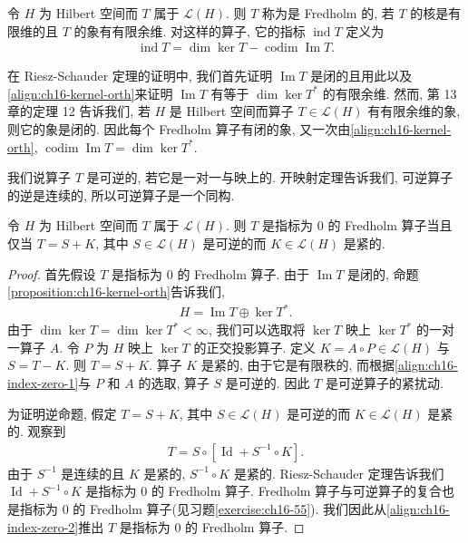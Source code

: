 \documentclass[../../main.tex]{subfiles}
\begin{document}
\begin{definition}[Fredholm 算子, 指标]\label{definition:ch16-fredholm}
令 $H$ 为 Hilbert 空间而 $T$ 属于 $\mathcal{L}(H)$. 则 $T$ 称为是 Fredholm 的, 若 $T$ 的核是有限维的且 $T$ 的象有有限余维. 对这样的算子, 它的指标 $\operatorname{ind}T$ 定义为
\begin{align*}
\operatorname{ind}T=\dim\ker T-\operatorname{codim}\operatorname{Im}T.
\end{align*}
\end{definition}

在 Riesz-Schauder 定理的证明中, 我们首先证明 $\operatorname{Im}T$ 是闭的且用此以及\eqref{align:ch16-kernel-orth}来证明 $\operatorname{Im}T$ 有等于 $\dim\ker T^{*}$ 的有限余维. 然而, 第 13 章的定理 12 告诉我们, 若 $H$ 是 Hilbert 空间而算子 $T\in\mathcal{L}(H)$ 有有限余维的象, 则它的象是闭的. 因此每个 Fredholm 算子有闭的象, 又一次由\eqref{align:ch16-kernel-orth}, $\operatorname{codim}\operatorname{Im}T=\dim\ker T^{*}$.

我们说算子 $T$ 是可逆的, 若它是一对一与映上的. 开映射定理告诉我们, 可逆算子的逆是连续的, 所以可逆算子是一个同构.

\begin{theorem}\label{theorem:ch16-index-zero}
令 $H$ 为 Hilbert 空间而 $T$ 属于 $\mathcal{L}(H)$. 则 $T$ 是指标为 $0$ 的 Fredholm 算子当且仅当 $T=S+K$, 其中 $S\in\mathcal{L}(H)$ 是可逆的而 $K\in\mathcal{L}(H)$ 是紧的.
\end{theorem}

\begin{proof}
首先假设 $T$ 是指标为 $0$ 的 Fredholm 算子. 由于 $\operatorname{Im}T$ 是闭的, 命题\cref{proposition:ch16-kernel-orth}告诉我们,
\begin{align}
H=\operatorname{Im}T\oplus\ker T^{*}.\label{align:ch16-index-zero-1}
\end{align}
由于 $\dim\ker T=\dim\ker T^{*}<\infty$, 我们可以选取将 $\ker T$ 映上 $\ker T^{*}$ 的一对一算子 $A$. 令 $P$ 为 $H$ 映上 $\ker T$ 的正交投影算子. 定义 $K=A\circ P\in\mathcal{L}(H)$ 与 $S=T-K$. 则 $T=S+K$. 算子 $K$ 是紧的, 由于它是有限秩的, 而根据\eqref{align:ch16-index-zero-1}与 $P$ 和 $A$ 的选取, 算子 $S$ 是可逆的. 因此 $T$ 是可逆算子的紧扰动.

为证明逆命题, 假定 $T=S+K$, 其中 $S\in\mathcal{L}(H)$ 是可逆的而 $K\in\mathcal{L}(H)$ 是紧的. 观察到
\begin{align}
T=S\circ[\operatorname{Id}+S^{-1}\circ K].\label{align:ch16-index-zero-2}
\end{align}
由于 $S^{-1}$ 是连续的且 $K$ 是紧的, $S^{-1}\circ K$ 是紧的. Riesz-Schauder 定理告诉我们 $\operatorname{Id}+S^{-1}\circ K$ 是指标为 $0$ 的 Fredholm 算子. Fredholm 算子与可逆算子的复合也是指标为 $0$ 的 Fredholm 算子(见习题\cref{exercise:ch16-55}). 我们因此从\eqref{align:ch16-index-zero-2}推出 $T$ 是指标为 $0$ 的 Fredholm 算子.
\end{proof}
\end{document}

